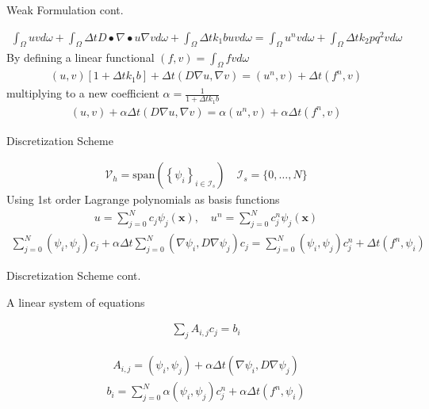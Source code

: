 \documentclass[11pt,t]{beamer}
\begin{document}
\begin{frame}[fragile]{Weak Formulation cont.}

\begin{gather*}
\int_{\Omega} {u} v d \omega+\int_{\Omega} \Delta t D \bullet \nabla \bullet u \nabla v d \omega+\int_{\Omega} \Delta tk_{1} b u v d \omega=\int_{\Omega} {u^{n}} v d \omega+\int_{\Omega} \Delta t k_{2} p q^{2} v d \omega
\end{gather*}
By defining a linear functional $(f, v) =\int_{\Omega} f v d \omega$
\begin{gather*}
(u, v)[1+\Delta t k_1 b]+\Delta t(D \nabla u, \nabla v)=\left(u^{n}, v\right)+\Delta t\left(f^{n}, v\right)
\end{gather*}
multiplying to a new coefficient $\alpha = \frac{1}{1+\Delta t k_1 b}$
\begin{gather*}
(u, v)+ \alpha \Delta t(D \nabla u, \nabla v)=\alpha \left(u^{n}, v\right)+ \alpha \Delta t\left(f^{n}, v\right)
\end{gather*}

\end{frame}




\begin{frame}[fragile]{Discretization Scheme}

\begin{gather*}
\mathcal{V}_h = \mathrm{span} \left( \left\{\psi_{i}\right\}_{i \in \mathcal{I}_{s}} \right) \quad \mathcal{I}_{s}=\{0, \ldots, N\}
\end{gather*}
Using 1st order Lagrange polynomials as basis functions
\begin{gather*}
u=\sum_{j=0}^{N} c_{j} \psi_{j}(\boldsymbol{x}), \quad u^{n}=\sum_{j=0}^{N} c_{j}^{n} \psi_{j}(\boldsymbol{x})
\end{gather*}
\begin{gather*}
\sum_{j=0}^{N}\left(\psi_{i}, \psi_{j}\right) c_{j} + \alpha \Delta t \sum_{j=0}^{N}\left(\nabla \psi_{i}, D \nabla \psi_{j}\right) c_{j} =\sum_{j=0}^{N}\left(\psi_{i}, \psi_{j}\right) c_{j}^{n}+\Delta t\left(f^{n}, \psi_{i}\right)
\end{gather*}
\end{frame}

\begin{frame}[fragile]{Discretization Scheme cont.}

A linear system of equations

\begin{gather*}
\sum_{j} A_{i, j} c_{j}=b_{i}
\end{gather*}

\begin{gather*}
A_{i, j}=\left(\psi_{i}, \psi_{j}\right) + \alpha \Delta t \left(\nabla \psi_{i}, D \nabla \psi_{j}\right)
\end{gather*}
\begin{gather*}
b_{i}=\sum_{j=0}^{N}\alpha \left(\psi_{i}, \psi_{j}\right) c_{j}^{n}+\alpha \Delta t\left(f^{n}, \psi_{i}\right)
\end{gather*}
\end{frame}
\end{document}
